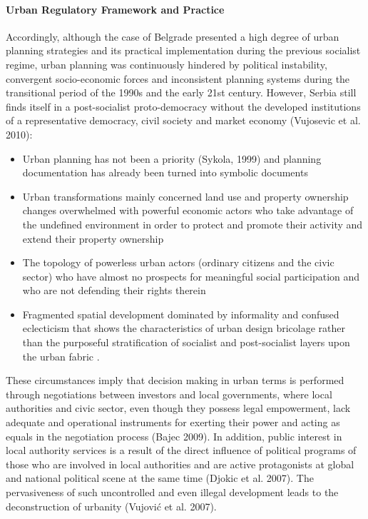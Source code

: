 \documentclass[11pt]{report}
\begin{document}
\paragraph{Urban Regulatory Framework and Practice}
Accordingly, although the case of Belgrade presented a high degree of urban planning strategies and its practical implementation during the previous socialist regime, urban planning was continuously hindered by political instability, convergent socio-economic forces and inconsistent planning systems during the transitional period of the 1990s and the early 21st century. 
However, Serbia still finds itself in a post-socialist proto-democracy without the developed institutions of a representative democracy, civil society and market economy (Vujosevic et al. 2010): 
\begin{itemize}
\item Urban planning has not been a priority (Sykola, 1999) and planning documentation has already been turned into symbolic documents \cite{Nedovic-Budic 2001}
\item Urban transformations mainly concerned land use and property ownership changes overwhelmed with powerful economic actors who take advantage of the undefined environment in order to protect and promote their activity and extend their property ownership 
\item The topology of powerless urban actors (ordinary citizens and the civic sector) who have almost no prospects for meaningful social participation and who are not defending their rights therein \cite{Vujovic et al. 2007} 
\item Fragmented spatial development dominated by informality and confused eclecticism that shows the characteristics of urban design bricolage rather than the purposeful stratification of socialist and post-socialist layers upon the urban fabric \cite{(Hirt 2008)}. 
\end{itemize}
These circumstances imply that decision making in urban terms is performed through negotiations between investors and local governments, where local authorities and civic sector, even though they possess legal empowerment, lack adequate and operational instruments for exerting their power and acting as equals in the negotiation process (Bajec 2009). In addition, public interest in local authority services is a result of the direct influence of political programs of those who are involved in local authorities and are active protagonists at global and national political scene at the same time (Djokic et al. 2007). The pervasiveness of such uncontrolled and even illegal development leads to the deconstruction of urbanity (Vujović et al. 2007).
\end{document}
